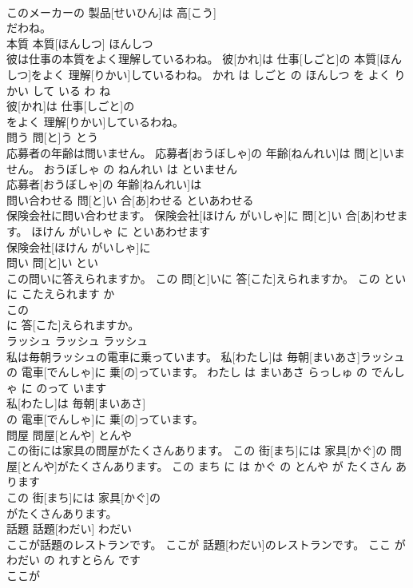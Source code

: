 \documentclass[8pt]{extreport}
\begin{document}
\begin{CJK}{UTF8}{min}
\\	このメーカーの 製品[せいひん]は 高[こう]
\\	だわね。			
\\	本質	本質[ほんしつ]	ほんしつ	
\\	彼は仕事の本質をよく理解しているわね。	彼[かれ]は 仕事[しごと]の 本質[ほんしつ]をよく 理解[りかい]しているわね。	かれ は しごと の ほんしつ を よく りかい して いる わ ね	
\\	彼[かれ]は 仕事[しごと]の
\\	をよく 理解[りかい]しているわね。			
\\	問う	問[と]う	とう	
\\	応募者の年齢は問いません。	応募者[おうぼしゃ]の 年齢[ねんれい]は 問[と]いません。	おうぼしゃ の ねんれい は といません	
\\	応募者[おうぼしゃ]の 年齢[ねんれい]は
\\	問い合わせる	問[と]い 合[あ]わせる	といあわせる	
\\	保険会社に問い合わせます。	保険会社[ほけん がいしゃ]に 問[と]い 合[あ]わせます。	ほけん がいしゃ に といあわせます	
\\	保険会社[ほけん がいしゃ]に
\\	問い	問[と]い	とい	
\\	この問いに答えられますか。	この 問[と]いに 答[こた]えられますか。	この とい に こたえられます か	
\\	この
\\	に 答[こた]えられますか。			
\\	ラッシュ	ラッシュ	ラッシュ	
\\	私は毎朝ラッシュの電車に乗っています。	私[わたし]は 毎朝[まいあさ]ラッシュの 電車[でんしゃ]に 乗[の]っています。	わたし は まいあさ らっしゅ の でんしゃ に のって います	
\\	私[わたし]は 毎朝[まいあさ]
\\	の 電車[でんしゃ]に 乗[の]っています。			
\\	問屋	問屋[とんや]	とんや	
\\	この街には家具の問屋がたくさんあります。	この 街[まち]には 家具[かぐ]の 問屋[とんや]がたくさんあります。	この まち に は かぐ の とんや が たくさん あります	
\\	この 街[まち]には 家具[かぐ]の
\\	がたくさんあります。			
\\	話題	話題[わだい]	わだい	
\\	ここが話題のレストランです。	ここが 話題[わだい]のレストランです。	ここ が わだい の れすとらん です	
\\	ここが

\end{CJK}
\end{document}
